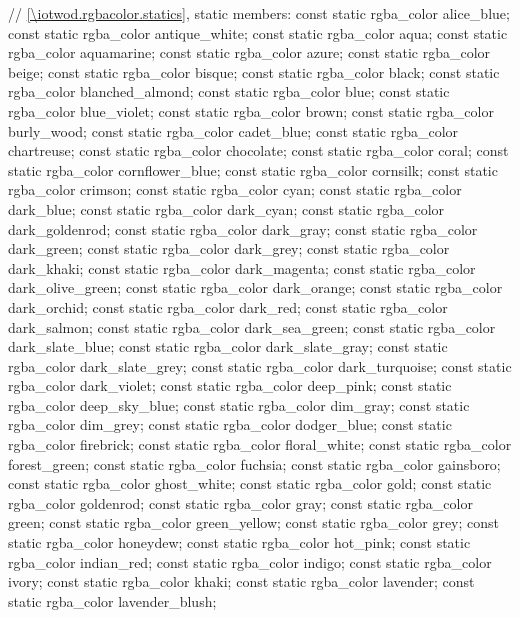 \begin{codeblock}
{{    // \ref{\iotwod.rgbacolor.statics}, static members:
    const static rgba_color alice_blue;
    const static rgba_color antique_white;
    const static rgba_color aqua;
    const static rgba_color aquamarine;
    const static rgba_color azure;
    const static rgba_color beige;
    const static rgba_color bisque;
    const static rgba_color black;
    const static rgba_color blanched_almond;
    const static rgba_color blue;
    const static rgba_color blue_violet;
    const static rgba_color brown;
    const static rgba_color burly_wood;
    const static rgba_color cadet_blue;
    const static rgba_color chartreuse;
    const static rgba_color chocolate;
    const static rgba_color coral;
    const static rgba_color cornflower_blue;
    const static rgba_color cornsilk;
    const static rgba_color crimson;
    const static rgba_color cyan;
    const static rgba_color dark_blue;
    const static rgba_color dark_cyan;
    const static rgba_color dark_goldenrod;
    const static rgba_color dark_gray;
    const static rgba_color dark_green;
    const static rgba_color dark_grey;
    const static rgba_color dark_khaki;
    const static rgba_color dark_magenta;
    const static rgba_color dark_olive_green;
    const static rgba_color dark_orange;
    const static rgba_color dark_orchid;
    const static rgba_color dark_red;
    const static rgba_color dark_salmon;
    const static rgba_color dark_sea_green;
    const static rgba_color dark_slate_blue;
    const static rgba_color dark_slate_gray;
    const static rgba_color dark_slate_grey;
    const static rgba_color dark_turquoise;
    const static rgba_color dark_violet;
    const static rgba_color deep_pink;
    const static rgba_color deep_sky_blue;
    const static rgba_color dim_gray;
    const static rgba_color dim_grey;
    const static rgba_color dodger_blue;
    const static rgba_color firebrick;
    const static rgba_color floral_white;
    const static rgba_color forest_green;
    const static rgba_color fuchsia;
    const static rgba_color gainsboro;
    const static rgba_color ghost_white;
    const static rgba_color gold;
    const static rgba_color goldenrod;
    const static rgba_color gray;
    const static rgba_color green;
    const static rgba_color green_yellow;
    const static rgba_color grey;
    const static rgba_color honeydew;
    const static rgba_color hot_pink;
    const static rgba_color indian_red;
    const static rgba_color indigo;
    const static rgba_color ivory;
    const static rgba_color khaki;
    const static rgba_color lavender;
    const static rgba_color lavender_blush;
}}
\end{codeblock}
